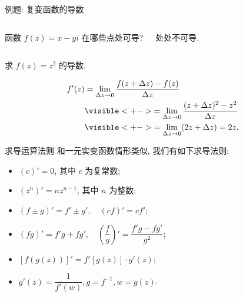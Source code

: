 \begin{frame}[<*>]{例题: 复变函数的导数}
	\onslide<+->
	\begin{columns}
		\begin{exercise}
			函数 $f(z)=x-yi$ 在哪些点处可导? 
		\end{exercise}\onslide<+->
		\begin{answer}
			处处不可导.
		\end{answer}
	\end{columns}

	\onslide<+->
	\begin{example}
		求 $f(z)=z^2$ 的导数.
	\end{example}

	\onslide<+->
	\begin{solution}
		\vspace{-\baselineskip}
		\begin{align*}
		f'(z)&=\lim_{\Delta z\to 0}\frac{f(z+\Delta z)-f(z)}{\Delta z}\\
		&\visible<+->{=\lim_{\Delta z\to 0}\frac{(z+\Delta z)^2-z^2}{\Delta z}}\\
		&\visible<+->{=\lim_{\Delta z\to 0}(2z+\Delta z)=2z.}
		\end{align*}
	\end{solution}
\end{frame}


\begin{frame}{求导运算法则}
	\onslide<+->
	和一元实变函数情形类似, 我们有如下求导法则:
	\begin{theorem}
		\begin{itemize}
			\item $(c)'=0$, 其中 $c$ 为复常数;
			\item $(z^n)'=nz^{n-1}$, 其中 $n$ 为整数;
			\item $(f\pm g)'=f'\pm g',\quad (cf)'=cf'$;
			\item $(fg)'=f'g+fg',\quad \left(\dfrac fg\right)'=\dfrac{f'g-fg'}{g^2}$;
			\item $[f(g(z))]'=f'[g(z)]\cdot g'(z)$;
			\item $g'(z)=\dfrac1{f'(w)}, g=f^{-1}, w=g(z)$.
		\end{itemize}
	\end{theorem}
\end{frame}


